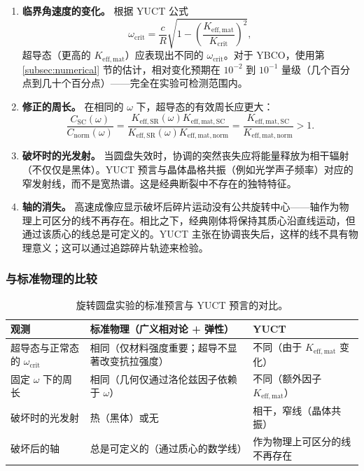 \documentclass[12pt,a4paper]{article}
\begin{document}
	\begin{enumerate}
		\item \textbf{临界角速度的变化。} 根据 YUCT 公式
		\[
		\omega_{\text{crit}} = \frac{c}{R}\sqrt{1 - \left(\frac{K_{\mathrm{eff,mat}}}{K_{\mathrm{crit}}}\right)^2},
		\]
		超导态（更高的 \(K_{\mathrm{eff,mat}}\)）应表现出不同的 \(\omega_{\text{crit}}\)。对于 YBCO，使用第 \ref{subsec:numerical} 节的估计，相对变化预期在 \(10^{-2}\) 到 \(10^{-1}\) 量级（几个百分点到几十个百分点）——完全在实验可检测范围内。
		
		\item \textbf{修正的周长。} 在相同的 \(\omega\) 下，超导态的有效周长应更大：
		\[
		\frac{C_{\text{SC}}(\omega)}{C_{\text{norm}}(\omega)} = \frac{K_{\mathrm{eff,SR}}(\omega) K_{\mathrm{eff,mat,SC}}}{K_{\mathrm{eff,SR}}(\omega) K_{\mathrm{eff,mat,norm}}} = \frac{K_{\mathrm{eff,mat,SC}}}{K_{\mathrm{eff,mat,norm}}} > 1.
		\]
		
		\item \textbf{破坏时的光发射。} 当圆盘失效时，协调的突然丧失应将能量释放为相干辐射（不仅仅是黑体）。YUCT 预言与晶体晶格共振（例如光学声子频率）对应的窄发射线，而不是宽热谱。这是经典断裂中不存在的独特特征。
		
		\item \textbf{轴的消失。} 高速成像应显示破坏后碎片运动没有公共旋转中心——轴作为物理上可区分的线不再存在。相比之下，经典刚体将保持其质心沿直线运动，但通过该质心的线总是可定义的。YUCT 主张在协调丧失后，这样的线不具有物理意义；这可以通过追踪碎片轨迹来检验。
	\end{enumerate}
	
	\subsubsection{与标准物理的比较}
	
	\begin{table}[h]
		\centering
		\caption{旋转圆盘实验的标准预言与 YUCT 预言的对比。}
		\label{tab:experiment_predictions}
		\begin{tabular}{p{5cm}p{4cm}p{4cm}}
			\toprule
			\textbf{观测} & \textbf{标准物理（广义相对论 + 弹性）} & \textbf{YUCT} \\
			\midrule
			超导态与正常态的 \(\omega_{\text{crit}}\) & 相同（仅材料强度重要；超导不显著改变抗拉强度） & 不同（由于 \(K_{\mathrm{eff,mat}}\) 变化） \\
			固定 \(\omega\) 下的周长 & 相同（几何仅通过洛伦兹因子依赖于 \(\omega\)） & 不同（额外因子 \(K_{\mathrm{eff,mat}}\)） \\
			破坏时的光发射 & 热（黑体）或无 & 相干，窄线（晶体共振） \\
			破坏后的轴 & 总是可定义的（通过质心的数学线） & 作为物理上可区分的线不再存在 \\
			\bottomrule
		\end{tabular}
	\end{table}
	
\end{document}
